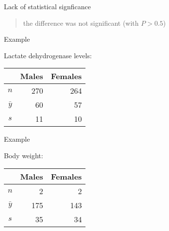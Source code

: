 \begin{frame}{Lack of statistical signficance}

    \begin{quote}
        the difference was \alert{not} significant (with $P>0.5$)
    \end{quote}



\end{frame}

\begin{frame}{Example}

  Lactate dehydrogenase levels:
  \begin{center}
    \begin{tabular}{crr}
       & Males & Females \\
       \hline
       $n$ & 270 & 264 \\
       $\bar y$ & 60 & 57 \\
       $s$ & 11 & 10
     \end{tabular}

   \vspace{2em}

   \end{center}

\end{frame}


\begin{frame}{Example}

  Body weight:
  \begin{center}
    \begin{tabular}{crr}
       & Males & Females \\
       \hline
       $n$ & 2 & 2 \\
       $\bar y$ & 175 & 143 \\
       $s$ & 35 & 34
     \end{tabular}

   \vspace{2em}

   \end{center}

\end{frame}


